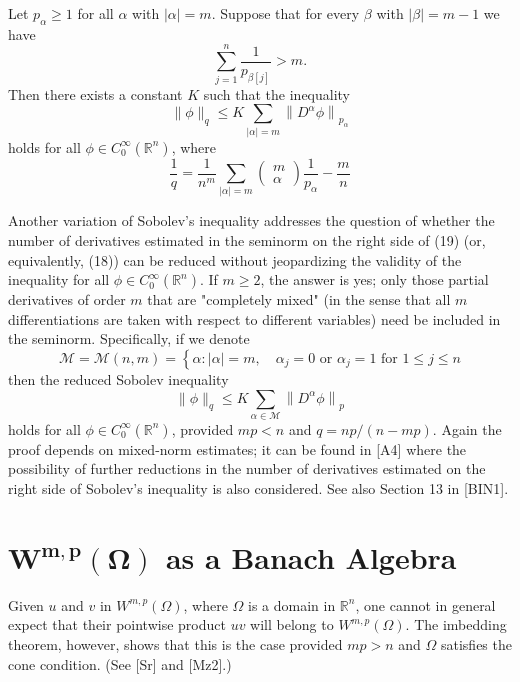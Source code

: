 \begin{theorem}
  Let $p_\alpha \geq 1$ for all $\alpha$ with $|\alpha|=m$. Suppose that for every $\beta$ with $|\beta|=m-1$ we have
  \[
  \sum_{j=1}^n \frac{1}{p_{\beta[j]}}>m .
  \]
  Then there exists a constant $K$ such that the inequality
  \[
  \|\phi\|_q \leq K \sum_{|\alpha|=m}\left\|D^\alpha \phi\right\|_{p_\alpha}
  \]
  holds for all $\phi \in C_0^{\infty}\left(\mathbb{R}^n\right)$, where
  \[
  \frac{1}{q}=\frac{1}{n^m} \sum_{|\alpha|=m}\left(\begin{array}{c}
  m \\
  \alpha
  \end{array}\right) \frac{1}{p_\alpha}-\frac{m}{n}
  \]
\end{theorem}


\begin{para}
  Another variation of Sobolev's inequality addresses the question of whether the number of derivatives estimated in the seminorm on the right side of (19) (or, equivalently, (18)) can be reduced without jeopardizing the validity of the inequality for all $\phi \in C_0^{\infty}\left(\mathbb{R}^n\right)$. If $m \geq 2$, the answer is yes; only those partial derivatives of order $m$ that are "completely mixed" (in the sense that all $m$ differentiations are taken with respect to different variables) need be included in the seminorm. Specifically, if we denote
  \[
  \mathcal{M}=\mathcal{M}(n, m)=\left\{\alpha:|\alpha|=m, \quad \alpha_j=0 \text { or } \alpha_j=1 \text { for } 1 \leq j \leq n\right.
  \]
  then the reduced Sobolev inequality
  \[
  \|\phi\|_q \leq K \sum_{\alpha \in \mathcal{M}}\left\|D^\alpha \phi\right\|_p
  \]
  holds for all $\phi \in C_0^{\infty}\left(\mathbb{R}^n\right)$, provided $m p<n$ and $q=n p /(n-m p)$. Again the proof depends on mixed-norm estimates; it can be found in [A4] where the possibility of further reductions in the number of derivatives estimated on the right side of Sobolev's inequality is also considered. See also Section 13 in [BIN1].
\end{para}


\section[$W^{m, p}(\Omega)$ as a Banach Algebra]%
  {$\bm{W^{m, p}(\Omega)}$ as a Banach Algebra}


\begin{para}
  Given $u$ and $v$ in $W^{m, p}(\Omega)$, where $\Omega$ is a domain in $\mathbb{R}^n$, one cannot in general expect that their pointwise product $u v$ will belong to $W^{m, p}(\Omega)$. The imbedding theorem, however, shows that this is the case provided $m p>n$ and $\Omega$ satisfies the cone condition. (See [Sr] and [Mz2].)
\end{para}



